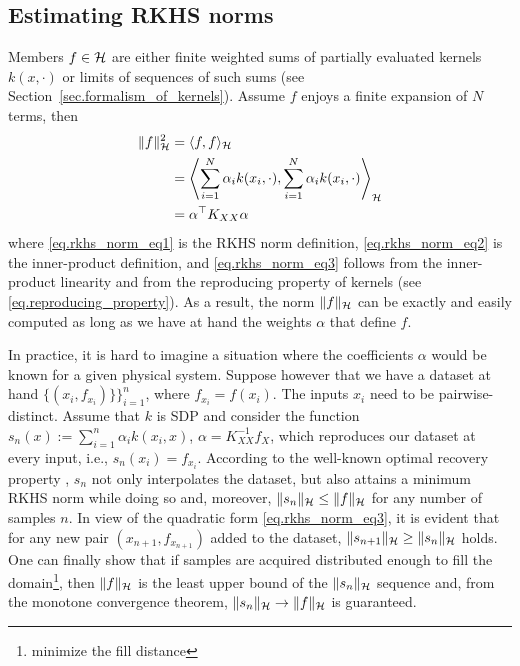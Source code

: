 \subsection{Estimating RKHS norms}
\label{sec.appendix_estimating_rkhs_norms}

Members $f \in \mathcal{H}$ are either finite weighted sums of partially evaluated kernels $k(x,\cdot)$ or limits of sequences of such sums (see Section~\ref{sec.formalism_of_kernels}). Assume $f$ enjoys a finite expansion of $N$ terms, then
\begin{align}
	\Vert f \Vert_{\mathcal{H}}^2 &= \langle f, f \rangle_{\mathcal{H}} \label{eq.rkhs_norm_eq1} \\
	&= \left\langle \sum_{i=1}^N \alpha_i k(x_i,\cdot), \sum_{i=1}^N \alpha_i k(x_i,\cdot) \right\rangle_{\mathcal{H}} \label{eq.rkhs_norm_eq2} \\
	&= \alpha^\top K_{XX} \alpha \label{eq.rkhs_norm_eq3}
\end{align}
where \eqref{eq.rkhs_norm_eq1} is the RKHS norm definition, \eqref{eq.rkhs_norm_eq2} is the inner-product definition, and \eqref{eq.rkhs_norm_eq3} follows from the inner-product linearity and from the reproducing property of kernels (see \eqref{eq.reproducing_property}). As a result, the norm $\Vert f \Vert_{\mathcal{H}}$ can be exactly and easily computed as long as we have at hand the weights $\alpha$ that define $f$.

In practice, it is hard to imagine a situation where the coefficients $\alpha$ would be known for a given physical system. Suppose however that we have a dataset at hand $\{(x_i,f_{x_i})\}\}_{i=1}^n$, where $f_{x_i} = f(x_i)$. The inputs $x_i$ need to be pairwise-distinct. Assume that $k$ is SDP and consider the function $s_n(x) := \sum_{i=1}^n \alpha_i k(x_i,x)$, $\alpha = K_{XX}^{-1} f_X$, which reproduces our dataset at every input, i.e., $s_n(x_i) = f_{x_i}$. According to the well-known optimal recovery property \cite[§8.3]{iske2018approximation}, $s_n$ not only interpolates the dataset, but also attains a minimum RKHS norm while doing so and, moreover, $\Vert s_n \Vert_{\mathcal{H}} \leq \Vert f \Vert_{\mathcal{H}}$ for any number of samples $n$. In view of the quadratic form \eqref{eq.rkhs_norm_eq3}, it is evident that for any new pair $(x_{n+1},f_{x_{n+1}})$ added to the dataset, $\Vert s_{n+1} \Vert_{\mathcal{H}} \geq \Vert s_n \Vert_{\mathcal{H}}$ holds. One can finally show that if samples are acquired distributed enough to fill the domain\footnote{minimize the fill distance}, then $\Vert f \Vert_{\mathcal{H}}$ is the least upper bound of the $\Vert s_n \Vert_{\mathcal{H}}$ sequence and, from the monotone convergence theorem, $\Vert s_n \Vert_{\mathcal{H}} \rightarrow \Vert f \Vert_{\mathcal{H}}$ is guaranteed.

